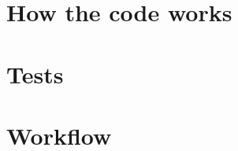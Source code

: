 \documentclass[11pt, letterpaper, onecolumn]{article}
\begin{document}
    
    
    
    
    \section{How the code works}








    

    \section{Tests}


















	\section{Workflow}
    
\end{document}
